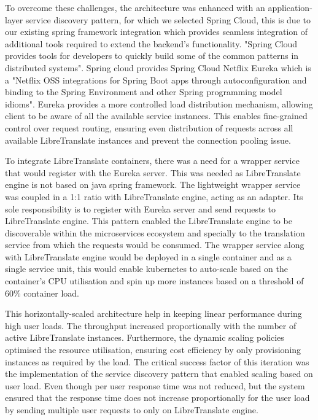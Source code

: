 To overcome these challenges, the architecture was enhanced with an application-layer service discovery pattern, for which we selected Spring Cloud, this is due to our existing spring framework integration which provides seamless integration of additional tools required to extend the backend's functionality. "Spring Cloud provides tools for developers to quickly build some of the common patterns in distributed systems"\cite{spring_cloud}. Spring cloud provides Spring Cloud Netflix Eureka which is a "Netflix OSS integrations for Spring Boot apps through autoconfiguration and binding to the Spring Environment and other Spring programming model idioms"\cite{spring_cloud_netflix}\cite{carnell2021spring}\cite{netflix_eureka}. Eureka provides a more controlled load distribution mechanism, allowing client to be aware of all the available service instances. This enables fine-grained control over request routing, ensuring even distribution of requests across all available LibreTranslate instances and prevent the connection pooling issue.

To integrate LibreTranslate containers, there was a need for a wrapper service that would register with the Eureka server. This was needed as LibreTranslate engine is not based on java spring framework. The lightweight wrapper service was coupled in a 1:1 ratio with LibreTranslate engine, acting as an adapter. Its sole responsibility is to register with Eureka server and send requests to LibreTranslate engine. This pattern enabled the LibreTranslate engine to be discoverable within the microservices ecosystem and specially to the translation service from which the requests would be consumed. The wrapper service along with LibreTranslate engine would be deployed in a single container and as a single service unit, this would enable kubernetes to auto-scale based on the container's CPU utilisation and spin up more instances based on a threshold of 60\% container load.

This horizontally-scaled architecture help in keeping linear performance during high user loads. The throughput increased proportionally with the number of active LibreTranslate instances. Furthermore, the dynamic scaling policies optimised the resource utilisation, ensuring cost efficiency by only provisioning instances as required by the load. The critical success factor of this iteration was the implementation of the service discovery pattern that enabled scaling based on user load. Even though per user response time was not reduced, but the system ensured that the response time does not increase proportionally for the user load by sending multiple user requests to only on LibreTranslate engine.

